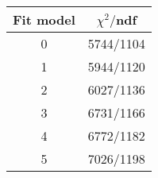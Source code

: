 \begin{tabular}{c|c}
Fit model & $\chi^2/$ndf \\
\hline
0 & 5744/1104\\
1 & 5944/1120\\
2 & 6027/1136\\
3 & 6731/1166\\
4 & 6772/1182\\
5 & 7026/1198\\
\end{tabular}
